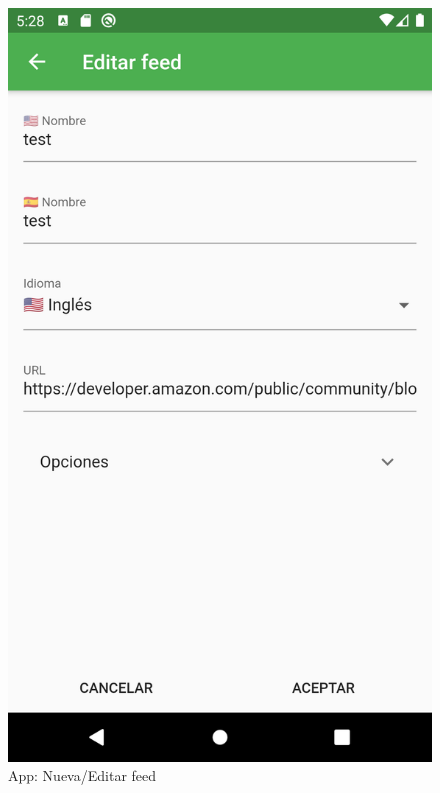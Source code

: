 \documentclass[11pt,spanish,listoffigures,listoftables,table,hyphens,dvipsnames]{tfgetsinf}
\begin{document}
\begin{figure}[ht]
   \centering
   \includegraphics[width=.9\textwidth]{app-editar-feed.png}
   \caption{App: Nueva/Editar feed}
   \label{figura:app-editar-feed}
\end{figure}
\end{document}
